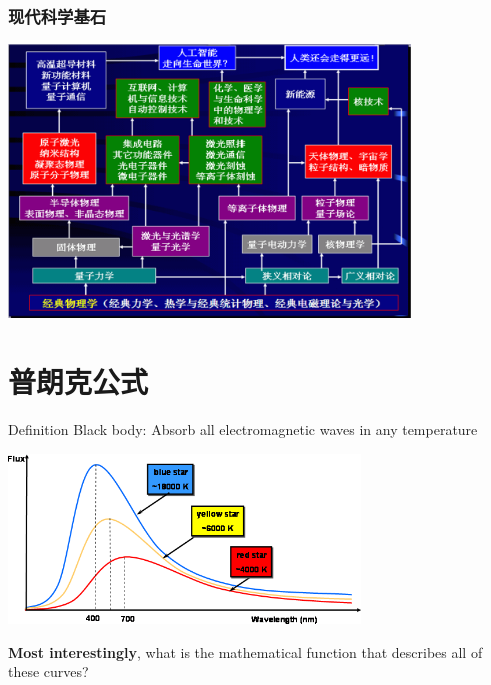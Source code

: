 \begin{frame}
    \frametitle{现代科学基石}
    \begin{center}
        \includegraphics[width=0.8\textwidth]{figs/stone.png}
    \end{center}   
\end{frame}

\section{普朗克公式}

\begin{frame}
    \begin{tcolorbox1}{Definition Black body:}
        Absorb all electromagnetic waves in any temperature
    \end{tcolorbox1}
    \begin{center}
        \includegraphics[width=0.7\textwidth]{figs/blackbody_radn_curves.png}
    \end{center}
    \textbf{\color{deepred} Most interestingly}, what is the mathematical function that describes all of these curves?
\end{frame}

